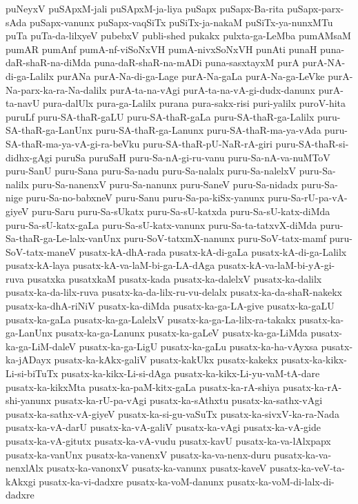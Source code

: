 {puNeyxV
puSApxM-jali
puSApxM-ja-liya
puSapx
puSapx-Ba-rita
puSapx-parx-sAda
puSapx-vanunx
puSapx-vaqSiTx
puSiTx-ja-nakaM
puSiTx-ya-nunxMTu
puTa
puTa-da-lilxyeV
pubebxV
publi-shed
pukakx
pulxta-ga-LeMba
pumAMsaM
pumAR
pumAnf
pumA-nf-viSoNxVH
pumA-nivxSoNxVH
punAti
punaH
puna-daR-shaR-na-diMda
puna-daR-shaR-na-mADi
puna-sasxtayxM
purA
purA-NA-di-ga-Lalilx
purANa
purA-Na-di-ga-Lage
purA-Na-gaLa
purA-Na-ga-LeVke
purA-Na-parx-ka-ra-Na-dalilx
purA-ta-na-vAgi
purA-ta-na-vA-gi-dudx-danunx
purA-ta-navU
pura-dalUlx
pura-ga-Lalilx
purana
pura-sakx-risi
puri-yalilx
puroV-hita
puruLf
puru-SA-thaR-gaLU
puru-SA-thaR-gaLa
puru-SA-thaR-ga-Lalilx
puru-SA-thaR-ga-LanUnx
puru-SA-thaR-ga-Lanunx
puru-SA-thaR-ma-ya-vAda
puru-SA-thaR-ma-ya-vA-gi-ra-beVku
puru-SA-thaR-pU-NaR-rA-giri
puru-SA-thaR-si-didhx-gAgi
puruSa
puruSaH
puru-Sa-nA-gi-ru-vanu
puru-Sa-nA-va-nuMToV
puru-SanU
puru-Sana
puru-Sa-nadu
puru-Sa-nalalx
puru-Sa-nalelxV
puru-Sa-nalilx
puru-Sa-nanenxV
puru-Sa-nanunx
puru-SaneV
puru-Sa-nidadx
puru-Sa-nige
puru-Sa-no-babxneV
puru-Sanu
puru-Sa-pa-kiSx-yanunx
puru-Sa-rU-pa-vA-giyeV
puru-Saru
puru-Sa-sUkatx
puru-Sa-sU-katxda
puru-Sa-sU-katx-diMda
puru-Sa-sU-katx-gaLa
puru-Sa-sU-katx-vanunx
puru-Sa-ta-tatxvX-diMda
puru-Sa-thaR-ga-Le-lalx-vanUnx
puru-SoV-tatxmX-nanunx
puru-SoV-tatx-mamf
puru-SoV-tatx-maneV
pusatx-kA-dhA-rada
pusatx-kA-di-gaLa
pusatx-kA-di-ga-Lalilx
pusatx-kA-laya
pusatx-kA-va-laM-bi-ga-LA-dAga
pusatx-kA-va-laM-bi-yA-gi-ruva
pusatxka
pusatxkaM
pusatx-kada
pusatx-ka-dalelxV
pusatx-ka-dalilx
pusatx-ka-da-lilx-ruva
pusatx-ka-da-lilx-ru-vu-delalx
pusatx-ka-da-shaR-nakekx
pusatx-ka-dhA-riNiV
pusatx-ka-diMda
pusatx-ka-ga-LA-give
pusatx-ka-gaLU
pusatx-ka-gaLa
pusatx-ka-ga-LalelxV
pusatx-ka-ga-La-lilx-ra-takakx
pusatx-ka-ga-LanUnx
pusatx-ka-ga-Lanunx
pusatx-ka-gaLeV
pusatx-ka-ga-LiMda
pusatx-ka-ga-LiM-daleV
pusatx-ka-ga-LigU
pusatx-ka-gaLu
pusatx-ka-ha-vAyxsa
pusatx-ka-jADayx
pusatx-ka-kAkx-galiV
pusatx-kakUkx
pusatx-kakekx
pusatx-ka-kikx-Li-si-biTuTx
pusatx-ka-kikx-Li-si-dAga
pusatx-ka-kikx-Li-yu-vaM-tA-dare
pusatx-ka-kikxMta
pusatx-ka-paM-kitx-gaLa
pusatx-ka-rA-shiya
pusatx-ka-rA-shi-yanunx
pusatx-ka-rU-pa-vAgi
pusatx-ka-sAthxtu
pusatx-ka-sathx-vAgi
pusatx-ka-sathx-vA-giyeV
pusatx-ka-si-gu-vaSuTx
pusatx-ka-sivxV-ka-ra-Nada
pusatx-ka-vA-darU
pusatx-ka-vA-galiV
pusatx-ka-vAgi
pusatx-ka-vA-gide
pusatx-ka-vA-gitutx
pusatx-ka-vA-vudu
pusatx-kavU
pusatx-ka-va-lAlxpapx
pusatx-ka-vanUnx
pusatx-ka-vanenxV
pusatx-ka-va-nenx-duru
pusatx-ka-va-nenxlAlx
pusatx-ka-vanonxV
pusatx-ka-vanunx
pusatx-kaveV
pusatx-ka-veV-ta-kAkxgi
pusatx-ka-vi-dadxre
pusatx-ka-voM-danunx
pusatx-ka-voM-di-lalx-di-dadxre
}
